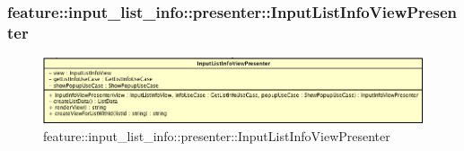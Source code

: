 \subsubsection{feature::input\_list\_info::presenter::InputListInfoViewPresenter}

\label{feature::input_list_info::presenter::InputListInfoViewPresenter}
\begin{figure}[ht]
	\centering
	\includegraphics[scale=0.5]{Sezioni/SottosezioniST/img/app/InputListInfoViewPresenter.png}
	\caption{feature::input\_list\_info::presenter::InputListInfoViewPresenter}
\end{figure}


